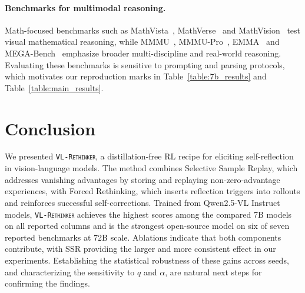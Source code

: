 \documentclass{article}
\newcommand{\model}{\texttt{\textsc{VL-Rethinker}}\xspace}
\begin{document}
\paragraph{Benchmarks for multimodal reasoning.} Math-focused benchmarks such as MathVista~\cite{mathvista}, MathVerse~\cite{mathverse} and MathVision~\cite{mathvision} test visual mathematical reasoning, while MMMU~\cite{yue2024mmmu}, MMMU-Pro~\cite{mmmupro}, EMMA~\cite{emma} and MEGA-Bench~\cite{chen2024mega} emphasize broader multi-discipline and real-world reasoning. Evaluating these benchmarks is sensitive to prompting and parsing protocols, which motivates our reproduction marks in Table~\ref{table:7b_results} and Table~\ref{table:main_results}.

\section{Conclusion}

We presented \model, a distillation-free RL recipe for eliciting self-reflection in vision-language models. The method combines Selective Sample Replay, which addresses vanishing advantages by storing and replaying non-zero-advantage experiences, with Forced Rethinking, which inserts reflection triggers into rollouts and reinforces successful self-corrections. Trained from Qwen2.5-VL Instruct models, \model achieves the highest scores among the compared 7B models on all reported columns and is the strongest open-source model on six of seven reported benchmarks at 72B scale. Ablations indicate that both components contribute, with SSR providing the larger and more consistent effect in our experiments. Establishing the statistical robustness of these gains across seeds, and characterizing the sensitivity to $q$ and $\alpha$, are natural next steps for confirming the findings.




\end{document}
